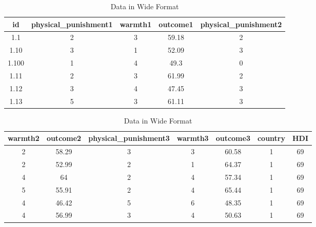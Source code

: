 \documentclass[
  letterpaper,
  DIV=11,
  numbers=noendperiod]{scrreprt}
\begin{document}
\begin{table}

\caption{\label{tbl-reshapewidedata}Data in Wide
Format}\begin{minipage}[t]{\linewidth}

{\centering 

\begin{tabular}[t]{ccccc}
\toprule
id & physical\_punishment1 & warmth1 & outcome1 & physical\_punishment2\\
\midrule
1.1 & 2 & 3 & 59.18 & 2\\
1.10 & 3 & 1 & 52.09 & 3\\
1.100 & 1 & 4 & 49.3 & 0\\
1.11 & 2 & 3 & 61.99 & 2\\
1.12 & 3 & 4 & 47.45 & 3\\
1.13 & 5 & 3 & 61.11 & 3\\
\bottomrule
\end{tabular}

}

\end{minipage}%
\newline
\begin{minipage}[t]{\linewidth}

{\centering 

\begin{tabular}[t]{ccccccc}
\toprule
warmth2 & outcome2 & physical\_punishment3 & warmth3 & outcome3 & country & HDI\\
\midrule
2 & 58.29 & 3 & 3 & 60.58 & 1 & 69\\
2 & 52.99 & 2 & 1 & 64.37 & 1 & 69\\
4 & 64 & 2 & 4 & 57.34 & 1 & 69\\
5 & 55.91 & 2 & 4 & 65.44 & 1 & 69\\
4 & 46.42 & 5 & 6 & 48.35 & 1 & 69\\
4 & 56.99 & 3 & 4 & 50.63 & 1 & 69\\
\bottomrule
\end{tabular}

}

\end{minipage}%
\newline
\begin{minipage}[t]{\linewidth}

{\centering 

}
\end{minipage}
\end{table}
\end{document}
